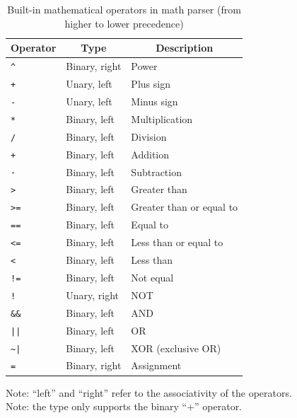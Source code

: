 \begin{table}
	\begin{center}
	\caption{Built-in mathematical operators in math parser
	(from higher to lower precedence)}\label{tab:MATHP-OPERATORS}
	\begin{tabular}{lll}
		\hline
		\multicolumn{1}{c}{\textbf{Operator}} & 
		\multicolumn{1}{c}{\textbf{Type}} &
		\multicolumn{1}{c}{\textbf{Description}} \\
		\hline
		\texttt{\^} & Binary, right & Power \\
		\texttt{+} & Unary, left & Plus sign \\
		\texttt{-} & Unary, left & Minus sign \\
		\texttt{*} & Binary, left & Multiplication \\
		\texttt{/} & Binary, left & Division \\
		\texttt{+} & Binary, left & Addition \\
		\texttt{-} & Binary, left & Subtraction \\
		\texttt{>} & Binary, left & Greater than \\
		\texttt{>=} & Binary, left & Greater than or equal to \\
		\texttt{==} & Binary, left & Equal to \\
		\texttt{<=} & Binary, left & Less than or equal to \\
		\texttt{<} & Binary, left & Less than \\
		\texttt{!=} & Binary, left & Not equal \\
		\texttt{!} & Unary, right & NOT \\
		\texttt{\&\&} & Binary, left & AND \\
		\texttt{||} & Binary, left & OR \\
		\texttt{\~{}|} & Binary, left & XOR (exclusive OR) \\
		\texttt{=} & Binary, right & Assignment \\
		\hline
	\end{tabular}
	\end{center}
	\footnotesize
	Note: ``left'' and ``right'' refer to the associativity
	of the operators. \\
	Note: the  type only supports the binary ``+'' operator.
\end{table}

